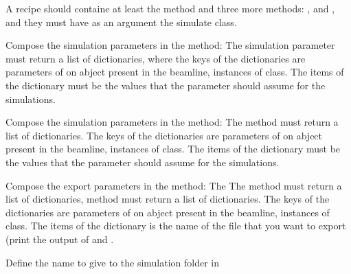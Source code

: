 \documentclass[letterpaper,10pt,english]{sphinxmanual}
\begin{document}
\sphinxAtStartPar
A recipe should containe at least the 
method and three more methods: ,
and ,
and they must have as an argument the simulate class.

\sphinxAtStartPar
Compose the simulation parameters in the  method:
The simulation parameter must return a list of dictionaries,
where the keys of the dictionaries are parameters of on abject
present in the beamline, instances of  class.
The items of the dictionary must be the values that the parameter should
assume for the simulations.

\sphinxAtStartPar
Compose the simulation parameters in the  method:
The  method must return a list of dictionaries.
The keys of the dictionaries are parameters of on abject
present in the beamline, instances of  class.
The items of the dictionary must be the values that the parameter should
assume for the simulations.

\sphinxAtStartPar
Compose the export parameters in the  method:
The The  method must return a list of dictionaries,
method must return a list of dictionaries.
The keys of the dictionaries are parameters of on abject
present in the beamline, instances of  class.
The items of the dictionary is the name of the file that you want to export
(print the output of  and
.

\sphinxAtStartPar
Define the name to give to the simulation folder
in 
\end{document}
